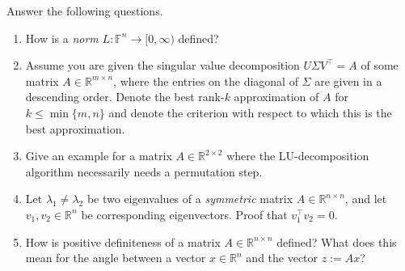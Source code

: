 Answer the following questions.
\begin{enumerate}
	\item How is a \textit{norm} $L: \mathbb{F}^n \to [0, \infty)$ defined?
	
	\item Assume you are given the singular value decomposition 
	$U \Sigma V^\top = A$ of some matrix $A \in \mathbb{R}^{m \times n}$, where the 
	entries on the diagonal of $\Sigma$ are given in a descending order.
	Denote the best rank-$k$ approximation of $A$ for $k \leq \min\{m,n\}$ and denote the criterion with respect to which this is the best approximation.
	
	
	\item Give an example for a matrix $A \in \mathbb{R}^{2 \times 2}$ where the LU-decomposition algorithm
	necessarily needs a permutation step.
	
	\item Let $\lambda_1 \neq \lambda_2$ be two eigenvalues of a \textit{symmetric} matrix $A \in \mathbb{R}^{n \times n}$, and let 
	$v_1, v_2 \in \mathbb{R}^n$ be corresponding eigenvectors. Proof that $v_1^\top v_2 = 0$.
	
	\item How is positive definiteness of a matrix $A\in \mathbb{R}^{n \times n}$ defined? What does this mean for the angle
	between a vector $x \in \mathbb{R}^{n}$ and the vector $z := Ax$?
\end{enumerate}